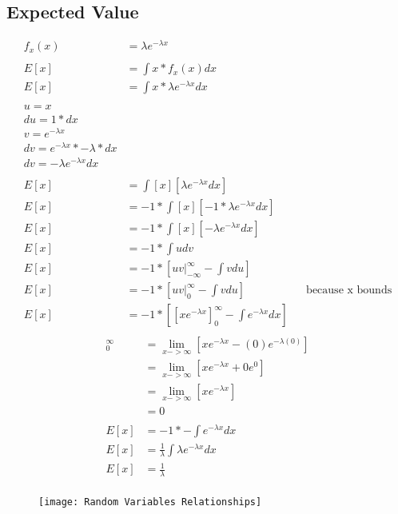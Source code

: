 \documentclass[]{book}
\begin{document}
\subsection{Expected Value}
\begin{align*}
f_x(x) &= \lambda e^{-\lambda x}\\
\\
E[x] &= \int {x*f_x(x)dx}\\
E[x] &= \int {x*\lambda e^{-\lambda x}dx}\\
\\
	u = x\\
	du = 1*dx\\
	v = e^{-\lambda x}\\
	dv = e^{-\lambda x}*-\lambda * dx\\
	dv = -\lambda e^{-\lambda x}dx\\
	\\
E[x] &= \int {[x] [\lambda e^{-\lambda x}dx]}\\
E[x] &= -1*\int {[x] [-1* \lambda e^{-\lambda x}dx]}\\
E[x] &= -1*\int {[x] [-\lambda e^{-\lambda x}dx]}\\
E[x] &= -1*\int {udv}\\
E[x] &= -1*[uv|_{-\infty}^{\infty} - \int {vdu}]\\
E[x] &= -1*[uv|_{0}^{\infty} - \int {vdu}] && \text{because x bounds}\\
E[x] &= -1*[[xe^{-\lambda x}]_{0}^{\infty} - \int {e^{-\lambda x}dx}]\\
\end{align*}
\begin{align*}
[xe^{-\lambda x}]_{0}^{\infty} &= \lim_{x->\infty}{[xe^{-\lambda x} - (0)e^{-\lambda (0)}]}\\
&= \lim_{x->\infty}{[xe^{-\lambda x} + 0e^{0}]}\\
&= \lim_{x->\infty}{[xe^{-\lambda x}]}\\
&= 0\\
\\
E[x] &= -1 * - \int {e^{-\lambda x}dx}\\
E[x] &= \frac{1}{\lambda} \int {\lambda e^{-\lambda x}dx}\\
E[x] &= \frac{1}{\lambda}\\
\end{align*}

\begin{figure}[h]
	\centering
	\texttt{[image: Random Variables Relationships]}
\end{figure}
\end{document}
